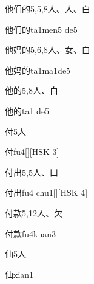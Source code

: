 \begin{Entry}{他们的}{5,5,8}{⼈、⼈、⽩}
  \begin{Phonetics}{他们的}{ta1men5 de5}
  \end{Phonetics}
\end{Entry}

\begin{Entry}{他妈的}{5,6,8}{⼈、⼥、⽩}
  \begin{Phonetics}{他妈的}{ta1ma1de5}
  \end{Phonetics}
\end{Entry}

\begin{Entry}{他的}{5,8}{⼈、⽩}
  \begin{Phonetics}{他的}{ta1 de5}
  \end{Phonetics}
\end{Entry}

\begin{Entry}{付}{5}{⼈}
  \begin{Phonetics}{付}{fu4}[][HSK 3]
  \end{Phonetics}
\end{Entry}

\begin{Entry}{付出}{5,5}{⼈、⼐}
  \begin{Phonetics}{付出}{fu4 chu1}[][HSK 4]
  \end{Phonetics}
\end{Entry}

\begin{Entry}{付款}{5,12}{⼈、⽋}
  \begin{Phonetics}{付款}{fu4kuan3}
  \end{Phonetics}
\end{Entry}

\begin{Entry}{仙}{5}{⼈}
  \begin{Phonetics}{仙}{xian1}
  \end{Phonetics}
\end{Entry}

